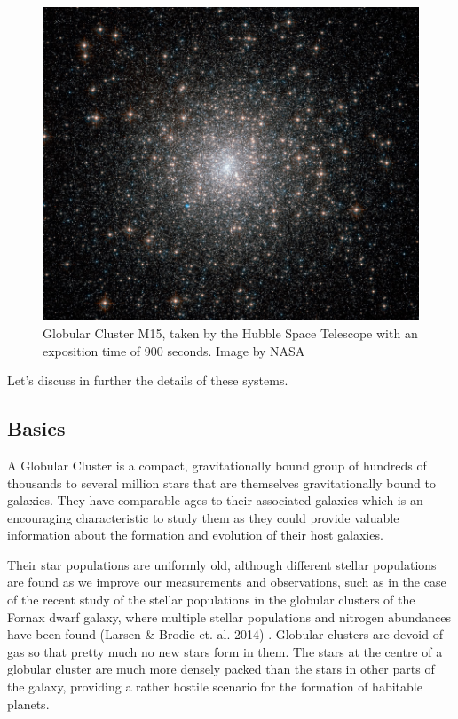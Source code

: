 \begin{figure}[H]
\centering
\includegraphics[width=12cm]{images/m15.jpg}
\caption[M15 Globular Cluster]{Globular Cluster M15, taken by the Hubble Space Telescope with an exposition time of 900 seconds. Image by NASA}
\end{figure}

Let's discuss in further the details of these systems.

\subsection{Basics}

A Globular Cluster is a compact, gravitationally bound group of hundreds of thousands to several million stars that are themselves gravitationally bound to galaxies. They have comparable ages to their associated galaxies which is an encouraging characteristic to study them as they could provide valuable information about the formation and evolution of their host galaxies.

Their star populations are uniformly old, although different stellar populations are found as we improve our measurements and observations, such as in the case of the recent study of the stellar populations in the globular clusters of the Fornax dwarf galaxy, where multiple stellar populations and nitrogen abundances have been found (Larsen \& Brodie et. al. 2014) \cite{15}. Globular clusters are devoid of gas so that pretty much no new stars form in them. The stars at the centre of a globular cluster are much more densely packed than the stars in other parts of the galaxy, providing a rather hostile scenario for the formation of habitable planets.

